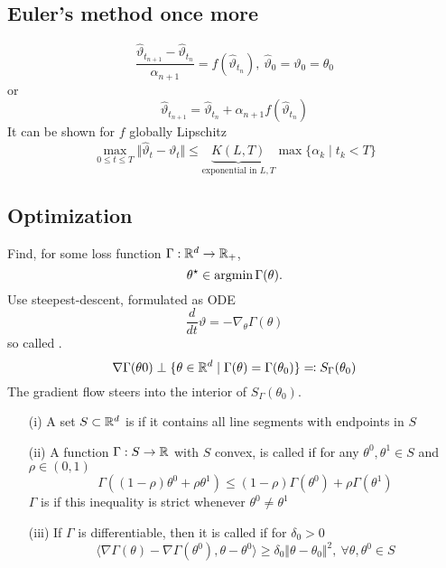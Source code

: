 \subsection{Euler's method once more}
\begin{equation}\label{eq:euler_v2}
    \frac{\hat{\vartheta}_{t_{n+1}}-\hat{\vartheta}_{t_{n}}}{\alpha_{n+1}} = f(\hat{\vartheta}_{t_n}),\ \hat{\vartheta}_0=\vartheta_0=\theta_0
\end{equation}
or \[\hat{\vartheta}_{t_{n+1}}= \hat{\vartheta}_{t_{n}}+\alpha_{n+1} f(\hat{\vartheta}_{t_n})\]
It can be shown for \(f\) globally Lipschitz
\begin{equation}
    \max_{0\leq t\leq T}\Vert \hat{\vartheta}_t-\vartheta_t\Vert \leq \underbrace{K(L,T)}_{\text{exponential in }L,T}\max\{\alpha_k\mid t_k< T\}
\end{equation} 

\subsection{Optimization}

 Find, for some loss function \(\Gamma:\mathbb{R}^d\to \mathbb{R}_+\),
\begin{equation}
    \theta^\star\in\operatorname*{\text{argmin}} \Gamma(\theta).
\end{equation} 
Use steepest-descent, formulated as ODE 
\begin{equation}\label{eq:gradient_flow}\frac{d}{dt}\vartheta=-\nabla_\theta \Gamma(\theta)\end{equation}
so called .
\[\nabla \Gamma(\theta0)\perp \{\theta\in\mathbb{R}^d\mid \Gamma(\theta)=\Gamma(\theta_0)\}\eqqcolon S_{\Gamma}(\theta_0)\]
The gradient flow steers into the interior of \(S_{\Gamma}(\theta_0)\).

\begin{definition}\label{def:28}
    \begin{enumerate}
        \item[(i)] A set \(S\subset \mathbb{R}^d\) is  if it contains all line segments with endpoints in \(S\)
        \item[(ii)] A function \(\Gamma:S\to\mathbb{R}\) with \(S\) convex, is called  
                    if for any \(\theta^0,\theta^1\in S\) and \(\rho\in (0,1)\) 
                    \[\Gamma((1-\rho)\theta^0+\rho\theta^1)\leq (1-\rho)\Gamma(\theta^0)+\rho\Gamma(\theta^1)\]
                    \(\Gamma\) is  if this inequality is strict whenever \(\theta^0\neq\theta^1\)
        \item[(iii)] If \(\Gamma\) is differentiable, then it is called  if for \(\delta_0>0\)
                     \[\langle\nabla \Gamma(\theta)-\nabla\Gamma(\theta^0),\theta-\theta^0\rangle\geq \delta_0 \Vert \theta-\theta_0\Vert^2,\ \forall \theta,\theta^0\in S\]           
    \end{enumerate}
\end{definition}

